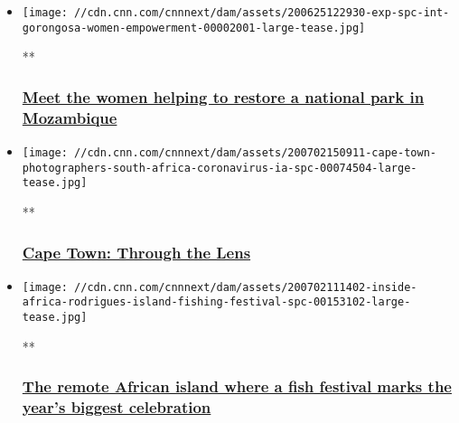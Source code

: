 \begin{itemize}
\item
  \href{/videos/travel/2020/06/25/exp-spc-int-gorongosa-women-empowerment.cnn}{}

  \texttt{[image: //cdn.cnn.com/cnnnext/dam/assets/200625122930-exp-spc-int-gorongosa-women-empowerment-00002001-large-tease.jpg]}

  **

  \hypertarget{meet-the-women-helping-to-restore-a-national-park-in-mozambique}{%
  \subsubsection{\texorpdfstring{\href{/videos/travel/2020/06/25/exp-spc-int-gorongosa-women-empowerment.cnn}{Meet
  the women helping to restore a national park in
  Mozambique}}{Meet the women helping to restore a national park in Mozambique}}\label{meet-the-women-helping-to-restore-a-national-park-in-mozambique}}
\end{itemize}

\begin{itemize}
\item
  \href{/videos/world/2020/07/02/cape-town-photographers-south-africa-coronavirus-ia-spc.cnn}{}

  \texttt{[image: //cdn.cnn.com/cnnnext/dam/assets/200702150911-cape-town-photographers-south-africa-coronavirus-ia-spc-00074504-large-tease.jpg]}

  **

  \hypertarget{cape-town-through-the-lens}{%
  \subsubsection{\texorpdfstring{\href{/videos/world/2020/07/02/cape-town-photographers-south-africa-coronavirus-ia-spc.cnn}{Cape
  Town: Through the
  Lens}}{Cape Town: Through the Lens}}\label{cape-town-through-the-lens}}
\end{itemize}

\begin{itemize}
\item
  \href{/videos/world/2020/07/01/inside-africa-rodrigues-island-fishing-festival-spc.cnn}{}

  \texttt{[image: //cdn.cnn.com/cnnnext/dam/assets/200702111402-inside-africa-rodrigues-island-fishing-festival-spc-00153102-large-tease.jpg]}

  **

  \hypertarget{the-remote-african-island-where-a-fish-festival-marks-the-years-biggest-celebration}{%
  \subsubsection{\texorpdfstring{\href{/videos/world/2020/07/01/inside-africa-rodrigues-island-fishing-festival-spc.cnn}{The
  remote African island where a fish festival marks the year's biggest
  celebration}}{The remote African island where a fish festival marks the year's biggest celebration}}\label{the-remote-african-island-where-a-fish-festival-marks-the-years-biggest-celebration}}
\end{itemize}

